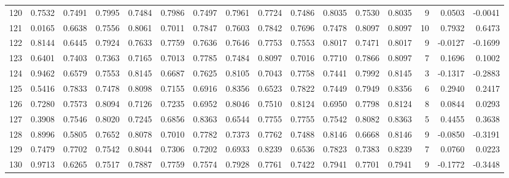 \begin{tabular}{lrrrrrrrrrrrrrrr}
120 &      0.7532 &  0.7491 &  0.7995 &  0.7484 &  0.7986 &  0.7497 &  0.7961 &  0.7724 &  0.7486 &  0.8035 &   0.7530 &     0.8035 &      9 &                    0.0503 &                    -0.0041 \\
121 &      0.0165 &  0.6638 &  0.7556 &  0.8061 &  0.7011 &  0.7847 &  0.7603 &  0.7842 &  0.7696 &  0.7478 &   0.8097 &     0.8097 &     10 &                    0.7932 &                     0.6473 \\
122 &      0.8144 &  0.6445 &  0.7924 &  0.7633 &  0.7759 &  0.7636 &  0.7646 &  0.7753 &  0.7553 &  0.8017 &   0.7471 &     0.8017 &      9 &                   -0.0127 &                    -0.1699 \\
123 &      0.6401 &  0.7403 &  0.7363 &  0.7165 &  0.7013 &  0.7785 &  0.7484 &  0.8097 &  0.7016 &  0.7710 &   0.7866 &     0.8097 &      7 &                    0.1696 &                     0.1002 \\
124 &      0.9462 &  0.6579 &  0.7553 &  0.8145 &  0.6687 &  0.7625 &  0.8105 &  0.7043 &  0.7758 &  0.7441 &   0.7992 &     0.8145 &      3 &                   -0.1317 &                    -0.2883 \\
125 &      0.5416 &  0.7833 &  0.7478 &  0.8098 &  0.7155 &  0.6916 &  0.8356 &  0.6523 &  0.7822 &  0.7449 &   0.7949 &     0.8356 &      6 &                    0.2940 &                     0.2417 \\
126 &      0.7280 &  0.7573 &  0.8094 &  0.7126 &  0.7235 &  0.6952 &  0.8046 &  0.7510 &  0.8124 &  0.6950 &   0.7798 &     0.8124 &      8 &                    0.0844 &                     0.0293 \\
127 &      0.3908 &  0.7546 &  0.8020 &  0.7245 &  0.6856 &  0.8363 &  0.6544 &  0.7755 &  0.7755 &  0.7542 &   0.8082 &     0.8363 &      5 &                    0.4455 &                     0.3638 \\
128 &      0.8996 &  0.5805 &  0.7652 &  0.8078 &  0.7010 &  0.7782 &  0.7373 &  0.7762 &  0.7488 &  0.8146 &   0.6668 &     0.8146 &      9 &                   -0.0850 &                    -0.3191 \\
129 &      0.7479 &  0.7702 &  0.7542 &  0.8044 &  0.7306 &  0.7202 &  0.6933 &  0.8239 &  0.6536 &  0.7823 &   0.7383 &     0.8239 &      7 &                    0.0760 &                     0.0223 \\
130 &      0.9713 &  0.6265 &  0.7517 &  0.7887 &  0.7759 &  0.7574 &  0.7928 &  0.7761 &  0.7422 &  0.7941 &   0.7701 &     0.7941 &      9 &                   -0.1772 &                    -0.3448 \\

\end{tabular}
